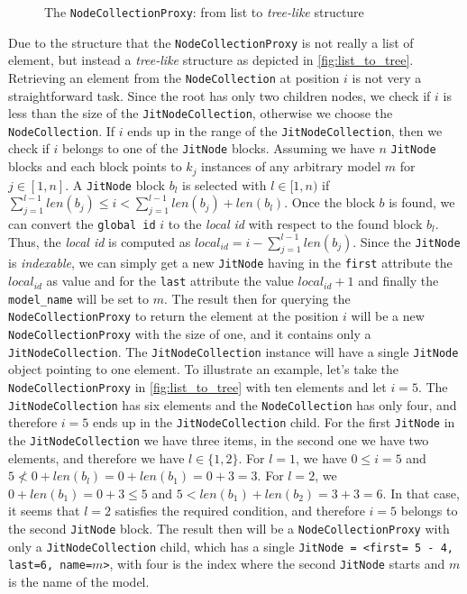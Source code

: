 \begin{figure}[ht!]
\begin{tikzpicture}[x=0.75pt,y=0.75pt,yscale=-1,xscale=1]
\end{tikzpicture}

    \caption{The \texttt{NodeCollectionProxy}: from list to \emph{tree-like} structure}
    \label{fig:list_to_tree}
\end{figure}


Due to the structure that the \texttt{NodeCollectionProxy} is not really a list of element, but instead a \emph{tree-like} structure as depicted in \autoref{fig:list_to_tree}. Retrieving an element from the \texttt{NodeCollection} at position $i$ is not very a straightforward task. Since the root has only two children nodes, we check if $i$ is less than the size of the \texttt{JitNodeCollection}, otherwise we choose the \texttt{NodeCollection}. If $i$ ends up in the range of the \texttt{JitNodeCollection}, then we check if $i$ belongs to one of the \texttt{JitNode} blocks. Assuming we have $n$ \texttt{JitNode} blocks and each block points to $k_j$ instances of any arbitrary model $m$ for $j \in [1, n]$. A \texttt{JitNode} block  $b_l$ is selected with $ l \in [1, n)$ if
$\sum_{j=1}^{l-1} len(b_j) \leq i < \sum_{j=1}^{l-1} len(b_j) + len(b_l)$. Once the block $b$ is found, we can convert the \texttt{global id} $i$ to the \emph{local id} with respect to the found block $b_l$. Thus, the \emph{local id} is computed as  $ local_{id} = i -\sum_{j=1}^{l-1} len(b_j)$. Since the \texttt{JitNode} is \emph{indexable}, we can simply get a new \texttt{JitNode} having in the \texttt{first} attribute the $local_{id}$ as value and for the \texttt{last} attribute the value $local_{id} + 1$ and finally the \texttt{model\_name} will be set to $m$. The result then for querying the \texttt{NodeCollectionProxy} to return the element at the position $i$ will be a new \texttt{NodeCollectionProxy} with the size of one,  and it contains only a \texttt{JitNodeCollection}. The \texttt{JitNodeCollection} instance will have a single \texttt{JitNode} object pointing to one element. To illustrate an example, let's take the \texttt{NodeCollectionProxy} in \autoref{fig:list_to_tree} with ten elements and let $i = 5$. The \texttt{JitNodeCollection} has six elements and the \texttt{NodeCollection} has only four, and therefore $i=5$ ends up in the \texttt{JitNodeCollection} child. For the first \texttt{JitNode} in the \texttt{JitNodeCollection} we have three items, in the second one we have two elements, and therefore we have $l \in \{1, 2\}$. For $l=1$, we have $0 \leq i = 5$ and $5 \not < 0 + len(b_l) = 0 + len(b_1) = 0 + 3 = 3$. For $l=2$, we $0 + len(b_1) = 0 + 3 \leq 5$ and $5 < len(b_1) + len(b_2) = 3 + 3 = 6.$ In that case, it seems that $l=2$ satisfies the required condition, and therefore $i=5$ belongs to the second \texttt{JitNode} block. The result then will be a \texttt{NodeCollectionProxy} with only a \texttt{JitNodeCollection} child, which has a single \texttt{JitNode = <first= 5 - 4, last=6, name=$m$>}, with four is the index where the second \texttt{JitNode} starts and $m$ is the name of the model.


